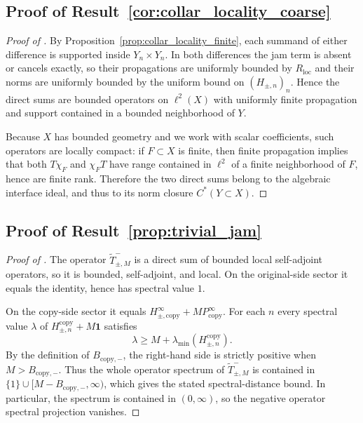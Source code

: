 \documentclass[11pt]{article}
\numberwithin{equation}{section}
\theoremstyle{definition}
\theoremstyle{remark}
\newcommand{\Id}{\mathbf{1}}
\begin{document}
\subsection{Proof of Result~\ref{cor:collar_locality_coarse}}\label{app:proof:cor:collar_locality_coarse}
\begin{proof}[Proof of ]
By Proposition~\ref{prop:collar_locality_finite}, each summand of either difference is supported
inside $Y_n\times Y_n$. In both differences the jam term is absent or cancels exactly, so their
propagations are uniformly bounded by $R_{\mathrm{loc}}$ and their norms are uniformly bounded by
the uniform bound on $(H_{\pm,n})_n$. Hence the direct sums are bounded operators on $\ell^2(X)$
with uniformly finite propagation and support contained in a bounded neighborhood of $Y$.

Because $X$ has bounded geometry and we work with scalar coefficients, such operators are locally
compact: if $F\subset X$ is finite, then finite propagation implies that both $T\chi_F$ and
$\chi_FT$ have range contained in $\ell^2$ of a finite neighborhood of $F$, hence are finite rank.
Therefore the two direct sums belong to the algebraic interface ideal, and thus to its norm closure
$C^*(Y\subset X)$.
\end{proof}

\subsection{Proof of Result~\ref{prop:trivial_jam}}\label{app:proof:prop:trivial_jam}
\begin{proof}[Proof of ]
The operator $\widetilde T^-_{\pm,M}$ is a direct sum of bounded local self-adjoint operators, so it
is bounded, self-adjoint, and local. On the original-side sector it equals the identity, hence has
spectral value $1$.

On the copy-side sector it equals $H_{\pm,\mathrm{copy}}^\infty+MP_{\mathrm{copy}}^\infty$. For each $n$
every spectral value $\lambda$ of $H_{\pm,n}^{\mathrm{copy}}+M\Id$ satisfies
\[
\lambda\ge M+\lambda_{\min}(H_{\pm,n}^{\mathrm{copy}}).
\]
By the definition of $B_{\mathrm{copy},-}$, the right-hand side is strictly positive when
$M>B_{\mathrm{copy},-}$. Thus the whole operator spectrum of $\widetilde T^-_{\pm,M}$ is contained in
$\{1\}\cup [M-B_{\mathrm{copy},-},\infty)$, which gives the stated spectral-distance bound. In
particular, the spectrum is contained in $(0,\infty)$, so the negative operator spectral projection
vanishes.
\end{proof}
\end{document}

